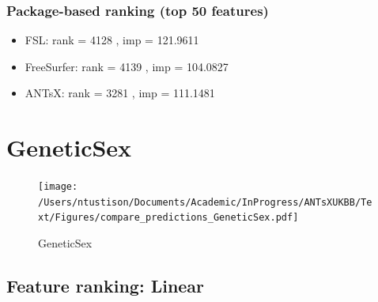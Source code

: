\documentclass[
  10pt,
]{article}
\begin{document}
\hypertarget{package-based-ranking-top-50-features-5}{%
\subsubsection{Package-based ranking (top 50
features)}\label{package-based-ranking-top-50-features-5}}

\begin{itemize}
\item
  FSL: rank = 4128 , imp = 121.9611
\item
  FreeSurfer: rank = 4139 , imp = 104.0827
\item
  ANTsX: rank = 3281 , imp = 111.1481
\end{itemize}

\clearpage

\hypertarget{geneticsex}{%
\section{GeneticSex}\label{geneticsex}}

\begin{figure}
\centering
\texttt{[image: /Users/ntustison/Documents/Academic/InProgress/ANTsXUKBB/Text/Figures/compare\_predictions\_GeneticSex.pdf]}
\caption{GeneticSex}
\end{figure}

\hypertarget{feature-ranking-linear-4}{%
\subsection{Feature ranking: Linear}\label{feature-ranking-linear-4}}
\end{document}
